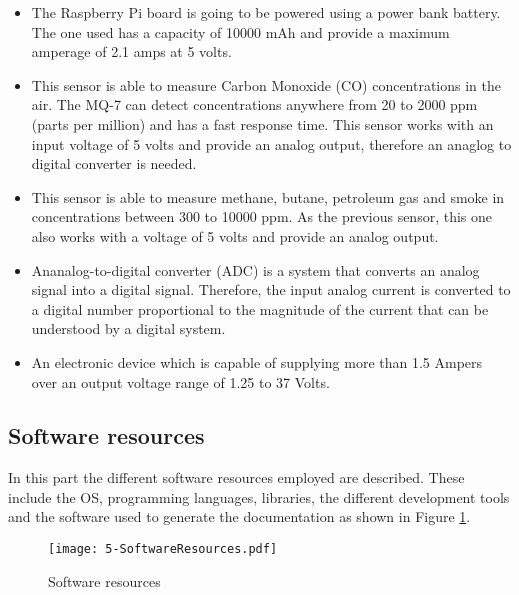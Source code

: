 \begin{itemize}
	\item {} The Raspberry Pi board is going to be powered using a power bank battery. The one used has a capacity of 10000 mAh and provide a maximum amperage of 2.1 amps at 5 volts.
	
	\item {} This sensor is able to measure Carbon Monoxide (CO) concentrations in the air. The MQ-7 can detect concentrations anywhere from 20 to 2000 ppm (parts per million) and has a fast response time. This sensor works with an input voltage of 5 volts and provide an analog output, therefore an anaglog to digital converter is needed.
	
	\item {} This sensor is able to measure methane, butane, petroleum gas and smoke in concentrations between 300 to 10000 ppm. As the previous sensor, this one also works with a voltage of 5 volts and provide an analog output.
	
	\item {} Ananalog-to-digital converter (ADC) is a system that converts an analog signal into a digital signal. Therefore, the input analog current is converted to a digital number proportional to the magnitude of the current that can be understood by a digital system.	
	
	\item {} An electronic device which is capable of supplying more than 1.5 Ampers over an output voltage range of 1.25 to 37 Volts.
	
\end{itemize} 



\subsection{Software resources}
In this part the different software resources employed are described. These include the \ac{OS}, programming languages, libraries, the different development tools and the software used to generate the documentation as shown in Figure \ref{fig:5-SoftwareResources}.

\begin{figure}[!h]
	\begin{center}
		\texttt{[image: 5-SoftwareResources.pdf]}
		\caption{Software resources}
		\label{fig:5-SoftwareResources}
	\end{center}
\end{figure}


